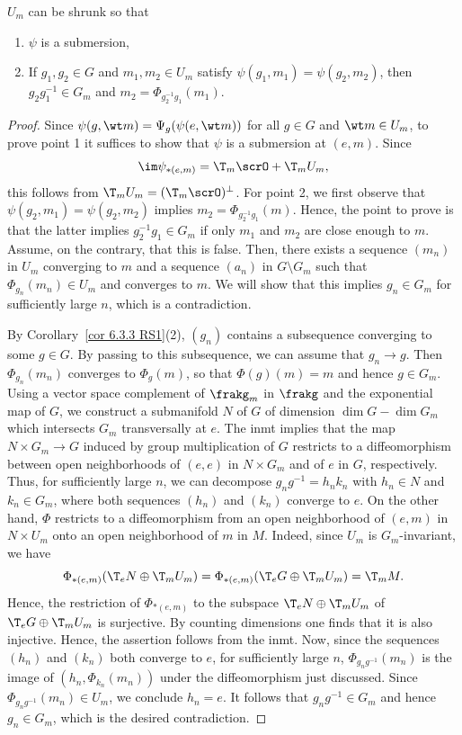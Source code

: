 \begin{lem}[{{\cite[Lem.~6.4.5]{RS1}}}]\label{lem 6.4.5 RS1}
    $U_m$ can be shrunk so that
    \begin{enumerate}
        \item $\psi$ is a submersion,
        \item If $g_1,g_2\in G$ and $m_1,m_2\in U_m$ satisfy $\psi(g_1,m_1)=\psi(g_2,m_2)$, then $g_2g_1^{-1}\in G_m$ and $m_2=\Phi_{g_2^{-1}g_1}(m_1)$.
    \end{enumerate}
\end{lem}
\begin{proof}
    Since $\psi(g,\wt m)=\Psi_g(\psi(e,\wt m))$ for all $g\in G$ and $\wt m\in U_m$, to prove point 1 it suffices to show that $\psi$ is a submersion at $(e,m)$. Since 
    \[\im \psi_{\ast(e,m)}=\T_m \scrO+\T_m U_m,\]
    this follows from $\T_m U_m=(\T_m \scrO)^\perp$. For point 2, we first observe that $\psi(g_2,m_1)=\psi(g_2,m_2)$ implies $m_2=\Phi_{g_2^{-1}g_1}(m)$. Hence, the point to prove is that the latter implies $g_2^{-1}g_1\in G_m$ if only $m_1$ and $m_2$ are close enough to $m$. Assume, on the contrary, that this is false. Then, there exists a sequence $(m_n)$ in $U_m$ converging to $m$ and a sequence $(a_n)$ in $G\setminus G_m$ such that $\Phi_{g_n}(m_n)\in U_m$ and converges to $m$. We will show that this implies $g_n\in G_m$ for sufficiently large $n$, which is a contradiction.

    By Corollary~\ref{cor 6.3.3 RS1}(2), $(g_n)$ contains a subsequence converging to some $g\in G$. By passing to this subsequence, we can assume that $g_n\to g$. Then $\Phi_{g_n}(m_n)$ converges to $\Phi_g(m)$, so that $\Phi(g)(m)=m$ and hence $g\in G_m$. Using a vector space complement of $\frakg_m$ in $\frakg$ and the exponential map of $G$, we construct a submanifold $N$ of $G$ of dimension $\dim G-\dim G_m$ which intersects $G_m$ transversally at $e$. The \gls{inmt} implies that the map $N\times G_m\to G$ induced by group multiplication of $G$ restricts to a diffeomorphism between open neighborhoods of $(e,e)$ in $N\times G_m$ and of $e$ in $G$, respectively. Thus, for sufficiently large $n$, we can decompose $g_n g^{-1}=h_nk_n$ with $h_n\in N$ and $k_n\in G_m$, where both sequences $(h_n)$ and $(k_n)$ converge to $e$. On the other hand, $\Phi$ restricts to a diffeomorphism from an open neighborhood of $(e,m)$ in $N\times U_m$ onto an open neighborhood of $m$ in $M$. Indeed, since $U_m$ is $G_m$-invariant, we have 
    \[\Phi_{\ast (e,m)}(\T_e N\oplus\T_m U_m)=\Phi_{\ast (e,m)}(\T_e G\oplus \T_m U_m)=\T_m M.\]
    Hence, the restriction of $\Phi_{\ast (e,m)}$ to the subspace $\T_e N\oplus \T_m U_m$ of $\T_e G\oplus \T_m U_m$ is surjective. By counting dimensions one finds that it is also injective. Hence, the assertion follows from the \gls{inmt}. Now, since the sequences $(h_n)$ and $(k_n)$ both converge to $e$, for sufficiently large $n$, $\Phi_{g_ng^{-1}}(m_n)$ is the image of $(h_n,\Phi_{k_n}(m_n))$ under the diffeomorphism just discussed. Since $\Phi_{g_ng^{-1}}(m_n)\in U_m$, we conclude $h_n=e$. It follows that $g_ng^{-1}\in G_m$ and hence $g_n\in G_m$, which is the desired contradiction.
\end{proof}


